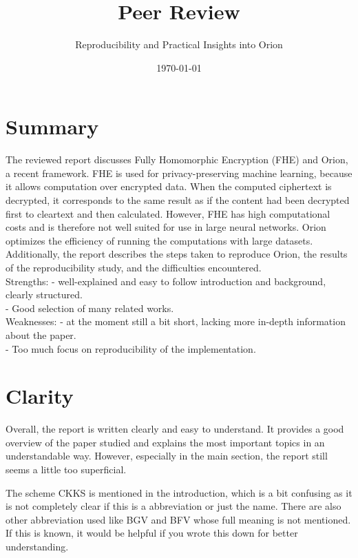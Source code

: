 \documentclass[a4paper]{article}
\author{Reproducibility and Practical Insights into Orion}
\title{Peer Review}
\date{\today}
\begin{document}
\maketitle

\section{Summary} %
The reviewed report discusses Fully Homomorphic Encryption (FHE) and Orion, a recent framework. FHE is used for privacy-preserving machine learning, because it allows computation over encrypted data. When the computed ciphertext is decrypted, it corresponds to the same result as if the content had been decrypted first to cleartext and then calculated. However, FHE has high computational costs and is therefore not well suited for use in large neural networks. Orion optimizes the efficiency of running the computations with large datasets.\\
Additionally, the report describes the steps taken to reproduce Orion, the results of the reproducibility study, and the difficulties encountered. \\
Strengths: - well-explained and easy to follow introduction and background, clearly structured. \\
- Good selection of many related works.\\
Weaknesses: - at the moment still a bit short, lacking more in-depth information about the paper. \\
- Too much focus on reproducibility of the implementation.

\section{Clarity} %
Overall, the report is written clearly and easy to understand. It provides a good overview of the paper studied and explains the most important topics in an understandable way. However, especially in the main section, the report still seems a little too superficial.

The scheme CKKS is mentioned in the introduction, which is a bit confusing as it is not completely clear if this is a abbreviation or just the name. There are also other abbreviation used like BGV and BFV whose full meaning is not mentioned. If this is known, it would be helpful if you wrote this down for better understanding. 
\end{document}
